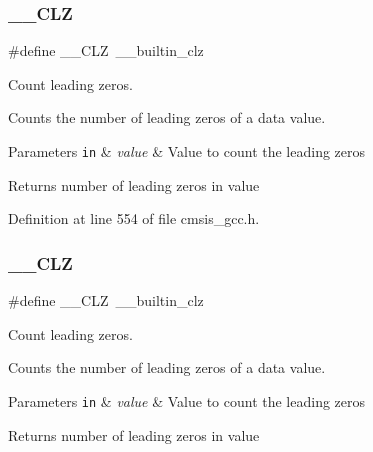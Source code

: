 \subsubsection{\texorpdfstring{\+\_\+\+\_\+\+C\+LZ}{\_\_CLZ}\hspace{0.1cm}{\footnotesize\ttfamily [2/3]}}
{\footnotesize\ttfamily \#define \+\_\+\+\_\+\+C\+LZ~\+\_\+\+\_\+builtin\+\_\+clz}



Count leading zeros. 

Counts the number of leading zeros of a data value. 
\begin{DoxyParams}[1]{Parameters}
\mbox{\tt in}  & {\em value} & Value to count the leading zeros \\
\hline
\end{DoxyParams}
\begin{DoxyReturn}{Returns}
number of leading zeros in value 
\end{DoxyReturn}


Definition at line 554 of file cmsis\+\_\+gcc.\+h.

\mbox{\label{group___c_m_s_i_s___core___instruction_interface_ga5d5bb1527e042be4a9fa5a33f65cc248}} 
\subsubsection{\texorpdfstring{\+\_\+\+\_\+\+C\+LZ}{\_\_CLZ}\hspace{0.1cm}{\footnotesize\ttfamily [3/3]}}
{\footnotesize\ttfamily \#define \+\_\+\+\_\+\+C\+LZ~\+\_\+\+\_\+builtin\+\_\+clz}



Count leading zeros. 

Counts the number of leading zeros of a data value. 
\begin{DoxyParams}[1]{Parameters}
\mbox{\tt in}  & {\em value} & Value to count the leading zeros \\
\hline
\end{DoxyParams}
\begin{DoxyReturn}{Returns}
number of leading zeros in value 
\end{DoxyReturn}


